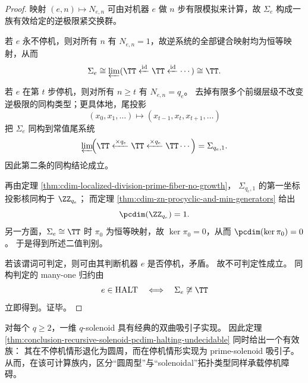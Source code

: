 \begin{proof}
映射 \((e,n)\mapsto N_{e,n}\) 可由对机器 \(e\) 做 \(n\) 步有限模拟来计算，故 \(\Sigma_e\) 构成一族有效给定的逆极限紧交换群。

若 \(e\) 永不停机，则对所有 \(n\) 有 \(N_{e,n}=1\)，故逆系统的全部键合映射均为恒等映射，从而
\[
\Sigma_e\cong \varprojlim(\TT\xleftarrow{\mathrm{id}}\TT\xleftarrow{\mathrm{id}}\cdots)\cong \TT.
\]

若 \(e\) 在第 \(t\) 步停机，则对所有 \(n\ge t\) 有 \(N_{e,n}=q_e\)。
去掉有限多个前缀层级不改变逆极限的同构类型；更具体地，尾投影
\[
(x_0,x_1,\dots)\longmapsto (x_{t-1},x_t,x_{t+1},\dots)
\]
把 \(\Sigma_e\) 同构到常值尾系统
\[
\varprojlim\!\Bigl(
\TT\xleftarrow{\times q_e}\TT\xleftarrow{\times q_e}\TT\cdots
\Bigr)=\Sigma_{q_e,1}.
\]
因此第二条的同构结论成立。

再由定理 \ref{thm:cdim-localized-division-prime-fiber-no-growth}，
\(\Sigma_{q_e,1}\) 的第一坐标投影核同构于 \(\ZZ_{q_e}\)；
而定理 \ref{thm:cdim-zn-procyclic-and-min-generators} 给出
\[
\pcdim(\ZZ_{q_e})=1.
\]
另一方面，\(\Sigma_e\cong \TT\) 时 \(\pi_0\) 为恒等映射，故 \(\ker\pi_0=0\)，从而 \(\pcdim(\ker\pi_0)=0\)。
于是得到所述二值判别。

若该谓词可判定，则可由其判断机器 \(e\) 是否停机，矛盾。
故不可判定性成立。
同构判定的 many-one 归约由
\[
e\in\mathrm{HALT}
\quad\Longleftrightarrow\quad
\Sigma_e\not\cong \TT
\]
立即得到。证毕。
\end{proof}

\begin{remark}\label{rem:conclusion-recursive-solenoid-attractor-undecidable}
对每个 \(q\ge 2\)，一维 \(q\)-solenoid 具有经典的双曲吸引子实现。
因此定理 \ref{thm:conclusion-recursive-solenoid-pcdim-halting-undecidable} 同时给出一个有效族：
其在不停机情形退化为圆周，而在停机情形实现为 prime-solenoid 吸引子。
从而，在该可计算族内，区分“圆周型”与“solenoidal”拓扑类型同样承载停机障碍。
\end{remark}
